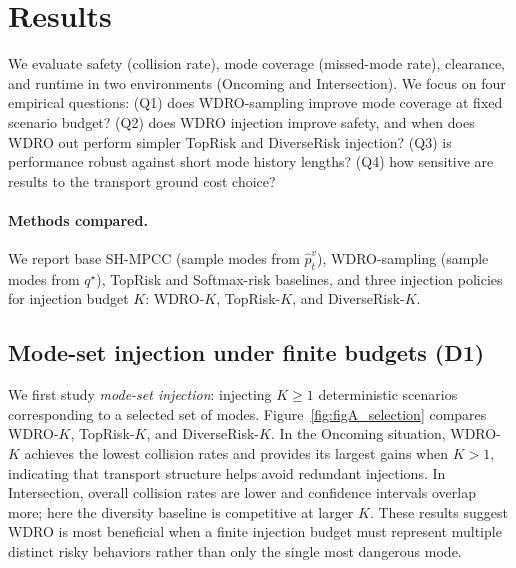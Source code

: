 \documentclass[letterpaper,10pt,conference]{ieeeconf}
\begin{document}

\section{Results}\label{results}

We evaluate safety (collision rate), mode coverage (missed-mode rate), clearance, and runtime in two environments (Oncoming and Intersection). We focus on four empirical questions: (Q1) does WDRO-sampling improve mode coverage at fixed scenario budget? (Q2) does WDRO injection improve safety, and when does WDRO out perform simpler TopRisk and DiverseRisk injection? (Q3) is performance robust against short mode history lengths? (Q4) how sensitive are results to the transport ground cost choice?

\paragraph{Methods compared.}
We report base SH-MPCC (sample modes from $\widehat p_t^v$),
WDRO-sampling (sample modes from $q^\star$),
TopRisk and Softmax-risk baselines,
and three injection policies for injection budget $K$: WDRO-$K$, TopRisk-$K$, and DiverseRisk-$K$.

\subsection{Mode-set injection under finite budgets (D1)}\label{sec:res_d1}
We first study \emph{mode-set injection}: injecting $K\ge 1$ deterministic scenarios corresponding to a selected set of modes. Figure~\ref{fig:figA_selection} compares WDRO-$K$, TopRisk-$K$, and DiverseRisk-$K$. In the Oncoming situation, WDRO-$K$ achieves the lowest collision rates and provides its largest gains when $K>1$, indicating that transport structure helps avoid redundant injections. In Intersection, overall collision rates are lower and confidence intervals overlap more; here the diversity baseline is competitive at larger $K$. These results suggest WDRO is most beneficial when a finite injection budget must represent multiple distinct risky behaviors rather than only the single most dangerous mode. 
\end{document}
